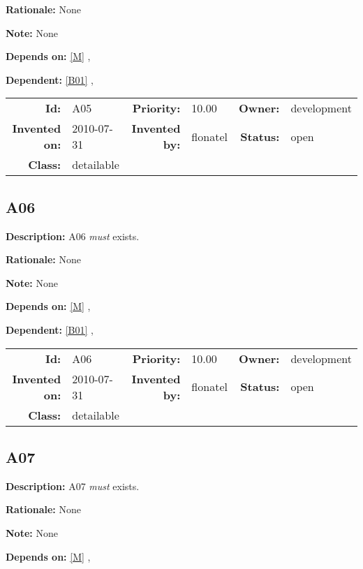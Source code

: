 \textbf{Rationale:} None

\textbf{Note:} None

\textbf{Depends on:} \ref{M} , 

\textbf{Dependent:} \ref{B01} , 

\par
{\small \begin{center}\begin{tabular}{rlrlrl}
\textbf{Id:} & A05 & \textbf{Priority:} & 10.00 & \textbf{Owner:} & development \\ 
\textbf{Invented on:} & 2010-07-31 & \textbf{Invented by:} & flonatel & \textbf{Status:} & open \\ 
\textbf{Class:} & detailable & & & & \\ 
\end{tabular}\end{center} }%
\subsection{A06}\label{A06}
\textbf{Description:} A06 \textsl{must} exists.

\textbf{Rationale:} None

\textbf{Note:} None

\textbf{Depends on:} \ref{M} , 

\textbf{Dependent:} \ref{B01} , 

\par
{\small \begin{center}\begin{tabular}{rlrlrl}
\textbf{Id:} & A06 & \textbf{Priority:} & 10.00 & \textbf{Owner:} & development \\ 
\textbf{Invented on:} & 2010-07-31 & \textbf{Invented by:} & flonatel & \textbf{Status:} & open \\ 
\textbf{Class:} & detailable & & & & \\ 
\end{tabular}\end{center} }%
\subsection{A07}\label{A07}
\textbf{Description:} A07 \textsl{must} exists.

\textbf{Rationale:} None

\textbf{Note:} None

\textbf{Depends on:} \ref{M} , 

